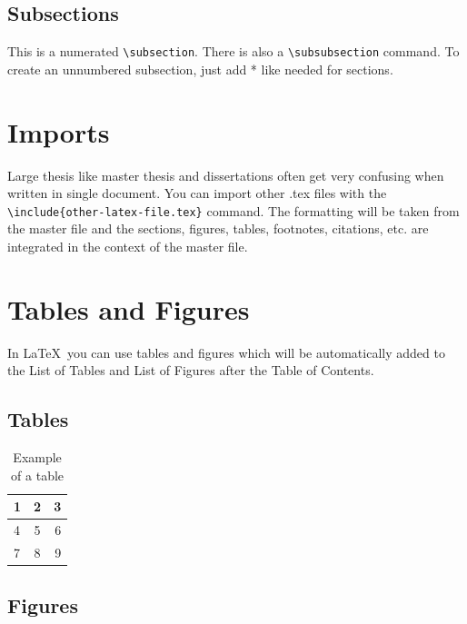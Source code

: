 \documentclass[bachelorarbeit,grey]{mas-thesis-sections}				%
\begin{document}
\subsection{Subsections}

This is a numerated \texttt{\textbackslash subsection}. There is also a \texttt{\textbackslash subsubsection} command. To create an unnumbered subsection, just add * like needed for sections.

\newpage

\section{Imports}

Large thesis like master thesis and dissertations often get very confusing when written in single document. You can import other .tex files with the \texttt{\textbackslash include\{other-latex-file.tex\}} command. The formatting will be taken from the master file and the sections, figures, tables, footnotes, citations, etc. are integrated in the context of the master file.

\newpage


\section{Tables and Figures}

In \LaTeX\ you can use tables and figures which will be automatically added to the List of Tables and List of Figures after the Table of Contents.

\subsection{Tables}

\begin{table}[ht]
\begin{center}
	\begin{tabular}{ l | c | r }
		1 & 2 & 3 \\
		\hline
		4 & 5 & 6 \\
		7 & 8 & 9 \\
	\end{tabular}
	\caption{Example of a table}
	\label{table:1}
\end{center}
\end{table}

\subsection{Figures}
\end{document}
